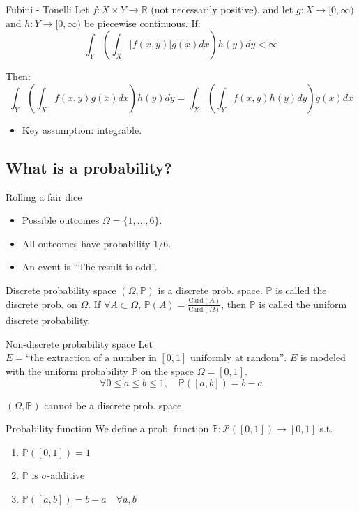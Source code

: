 \documentclass[11pt, a4paper]{article}
\begin{document}
\begin{theorem}{Fubini - Tonelli}{}
Let $f: X \times Y \to \mathbb{R}$ (not necessarily positive), and let $g: X \to [0,\infty)$ and $h: Y \to [0,\infty)$ be piecewise continuous. If:
\[\int_Y \left( \int_X \vert{}f(x,y)\vert{} g(x) dx \right) h(y) dy < \infty\]

Then:
\[\int_Y \left( \int_X f(x,y) g(x) dx \right) h(y) dy = \int_X \left( \int_Y f(x,y) h(y) dy \right) g(x) dx\]

\begin{itemize}
    \item Key assumption: integrable.
\end{itemize}
\end{theorem}

\subsection*{What is a probability?}

\begin{example}{Rolling a fair dice}{}
\begin{itemize}
    \item Possible outcomes $\Omega = \{1, \dots, 6\}$.
    \item All outcomes have probability $1/6$.
    \item An event is ``The result is odd''.
\end{itemize}
\end{example}

\begin{proposition}{Discrete probability space}{}
$(\Omega, \mathbb{P})$ is a discrete prob. space. $\mathbb{P}$ is called the discrete prob. on $\Omega$.
If $\forall A \subset \Omega$, $\mathbb{P}(A) = \frac{\text{Card}(A)}{\text{Card}(\Omega)}$, then $\mathbb{P}$ is called the uniform discrete probability.
\end{proposition}

\begin{example}{Non-discrete probability space}{}
Let $E = \text{``the extraction of a number in } [0, 1] \text{ uniformly at random''}$.
$E$ is modeled with the uniform probability $\mathbb{P}$ on the space $\Omega = [0,1]$.
\[\forall 0 \le a \le b \le 1, \quad \mathbb{P}([a,b]) = b - a\]

$(\Omega, \mathbb{P})$ cannot be a discrete prob. space.
\end{example}

\begin{definition}{Probability function}{}
We define a prob. function $\mathbb{P}: \mathcal{P}([0, 1]) \to [0, 1]$ s.t.
\begin{enumerate}
    \item $\mathbb{P}([0, 1]) = 1$
    \item $\mathbb{P}$ is $\sigma$-additive
    \item $\mathbb{P}([a, b]) = b - a \quad \forall a, b$
\end{enumerate}
\end{definition}
\end{document}
